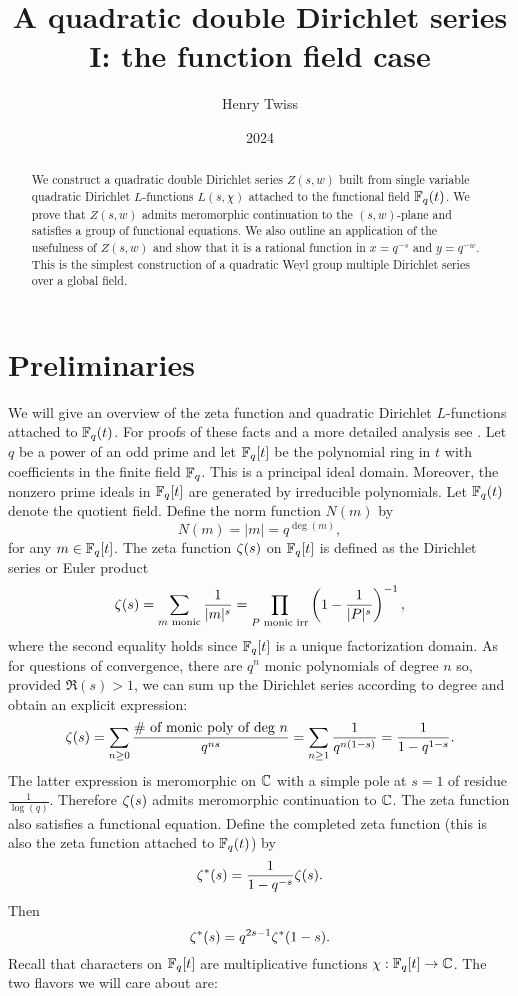 \documentclass[12pt,reqno,oneside]{amsart}
\title{A quadratic double Dirichlet series I: the function field case}
\author{Henry Twiss}
\date{2024}
\begin{document}
\begin{abstract}
    We construct a quadratic double Dirichlet series $Z(s,w)$ built from single variable quadratic Dirichlet $L$-functions $L(s,\chi)$ attached to the functional field $\mathbb{F}_{q}(t)$. We prove that $Z(s,w)$ admits meromorphic continuation to the $(s,w)$-plane and satisfies a group of functional equations. We also outline an application of the usefulness of $Z(s,w)$ and show that it is a rational function in $x = q^{-s}$ and $y = q^{-w}$. This is the simplest construction of a quadratic Weyl group multiple Dirichlet series over a global field.
\end{abstract}

\maketitle

\section{Preliminaries}
    We will give an overview of the zeta function and quadratic Dirichlet $L$-functions attached to $\mathbb{F}_{q}(t)$. For proofs of these facts and a more detailed analysis see \cite{rosen2002number}. Let $q$ be a power of an odd prime and let $\mathbb{F}_{q}[t]$ be the polynomial ring in $t$ with coefficients in the finite field $\mathbb{F}_{q}$. This is a principal ideal domain. Moreover, the nonzero prime ideals in $\mathbb{F}_{q}[t]$ are generated by irreducible polynomials. Let $\mathbb{F}_{q}(t)$ denote the quotient field. Define the norm function $N(m)$ by
    \[
        N(m) = |m| = q^{\deg(m)},
    \]
    for any $m \in \mathbb{F}_{q}[t]$. The zeta function $\zeta(s)$ on $\mathbb{F}_{q}[t]$ is defined as the Dirichlet series or Euler product
    \[
        \zeta(s) = \sum_{\text{$m$ monic}}\frac{1}{|m|^{s}} = \prod_{\text{$P$ monic irr}}\left(1-\frac{1}{|P|^{s}}\right)^{-1},
    \]
    where the second equality holds since $\mathbb{F}_{q}[t]$ is a unique factorization domain. As for questions of convergence, there are $q^{n}$ monic polynomials of degree $n$ so, provided $\Re(s) > 1$, we can sum up the Dirichlet series according to degree and obtain an explicit expression:
    \[
        \zeta(s) = \sum_{n \ge 0}\frac{\text{\# of monic poly of deg $n$}}{q^{ns}} = \sum_{n \ge 1}\frac{1}{q^{n(1-s)}} = \frac{1}{1-q^{1-s}}.
    \]
    The latter expression is meromorphic on $\mathbb{C}$ with a simple pole at $s = 1$ of residue $\frac{1}{\log(q)}$. Therefore $\zeta(s)$ admits meromorphic continuation to $\mathbb{C}$. The zeta function also satisfies a functional equation. Define the completed zeta function (this is also the zeta function attached to $\mathbb{F}_{q}(t)$) by
    \[
        \zeta^{\ast}(s) = \frac{1}{1-q^{-s}}\zeta(s).
    \]
    Then
    \[
        \zeta^{\ast}(s) = q^{2s-1}\zeta^{\ast}(1-s).
    \]
    Recall that characters on $\mathbb{F}_{q}[t]$ are multiplicative functions $\chi:\mathbb{F}_{q}[t] \to \mathbb{C}$. The two flavors we will care about are:
    
\end{document}
